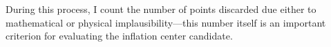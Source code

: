


During this process, I count the number of points discarded due either to mathematical or physical implausibility---this number itself is an important criterion for evaluating the inflation center candidate.

